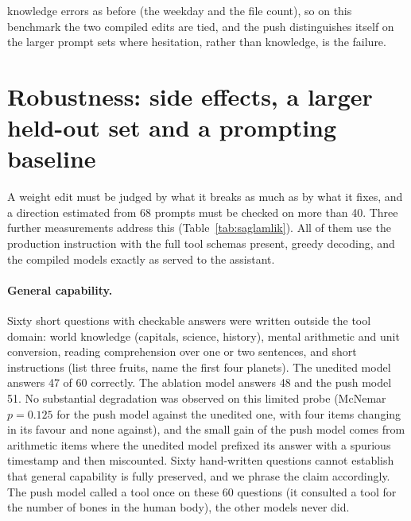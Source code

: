 \documentclass[11pt]{article}
\begin{document}
knowledge errors as before (the weekday and the file count), so on this benchmark the two compiled edits are tied, and the push distinguishes itself on the larger prompt sets where hesitation, rather than knowledge, is the failure.

\section{Robustness: side effects, a larger held-out set and a prompting baseline}
\label{sec:saglamlik}

A weight edit must be judged by what it breaks as much as by what it fixes, and a direction estimated from 68 prompts must be checked on more than 40. Three further measurements address this (Table~\ref{tab:saglamlik}). All of them use the production instruction with the full tool schemas present, greedy decoding, and the compiled models exactly as served to the assistant.

\paragraph{General capability.} Sixty short questions with checkable answers were written outside the tool domain: world knowledge (capitals, science, history), mental arithmetic and unit conversion, reading comprehension over one or two sentences, and short instructions (list three fruits, name the first four planets). The unedited model answers 47 of 60 correctly. The ablation model answers 48 and the push model 51. No substantial degradation was observed on this limited probe (McNemar $p = 0.125$ for the push model against the unedited one, with four items changing in its favour and none against), and the small gain of the push model comes from arithmetic items where the unedited model prefixed its answer with a spurious timestamp and then miscounted. Sixty hand-written questions cannot establish that general capability is fully preserved, and we phrase the claim accordingly. The push model called a tool once on these 60 questions (it consulted a tool for the number of bones in the human body), the other models never did.
\end{document}
